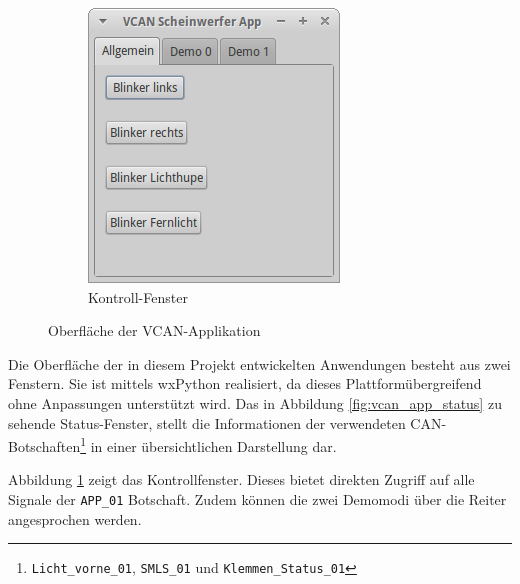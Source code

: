 \documentclass[
  a4paper,					    %
  twoside,
  DIV=calc,     				%
  bibliography=totoc,
  cleardoublepage=empty,
  ngerman,     					%
  final       					%
]{scrbook}
\begin{document}
\begin{figure}
\begin{subfigure}[b]{0.39\textwidth}
        \includegraphics[width=\textwidth]{vcan_app_control}
        \caption{Kontroll-Fenster}
        \label{fig:vcan_app_control}
    \end{subfigure}
    \caption{Oberfläche der VCAN-Applikation}
    \label{fig:vcan_app}
\end{figure}

Die Oberfläche der in diesem Projekt entwickelten Anwendungen besteht aus zwei Fenstern. Sie ist mittels wxPython realisiert, da dieses Plattformübergreifend ohne Anpassungen unterstützt wird. Das in Abbildung \ref{fig:vcan_app_status} zu sehende Status-Fenster, stellt die Informationen der verwendeten CAN-Botschaften\footnote{\texttt{Licht\_vorne\_01}, \texttt{SMLS\_01} und \texttt{Klemmen\_Status\_01}} in einer übersichtlichen Darstellung dar.

Abbildung \ref{fig:vcan_app_control} zeigt das Kontrollfenster. Dieses bietet direkten Zugriff auf alle Signale der \texttt{APP\_01} Botschaft. Zudem können die zwei Demomodi über die Reiter angesprochen werden.
\end{document}

